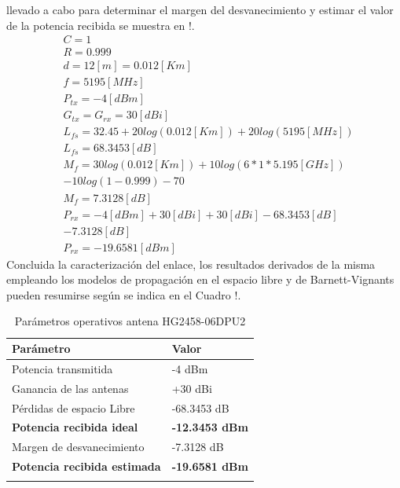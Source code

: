 \documentclass[conference]{IEEEtran}
\begin{document}
llevado a cabo para determinar el margen del desvanecimiento y estimar el valor de la potencia recibida se muestra en !.
\begin{equation}
    \label{eq:Eq7}
    \begin{aligned}
        &C = 1\\
        &R = 0.999\\
        &d = 12[m] = 0.012[Km]\\
        &f = 5195[MHz]\\
        &P_{tx} = -4[dBm]\\
        &G_{tx} = G_{rx} = 30[dBi]\\
        &L_{fs} = 32.45+20log(0.012[Km])+20log(5195[MHz])\\
        &L_{fs} = 68.3453[dB]\\
        &M_{f} = 30log(0.012[Km]) + 10log(6*1*5.195[GHz])\\
        & - 10log(1-0.999) - 70\\
        &M_{f} = 7.3128[dB]\\
        &P_{rx} = -4[dBm] + 30[dBi] + 30[dBi] - 68.3453[dB]\\
        & - 7.3128[dB]\\
        &P_{rx} = -19.6581[dBm]
    \end{aligned}
\end{equation}
Concluida la caracterización del enlace, los resultados derivados de la misma empleando los modelos de 
propagación en el espacio libre y de Barnett-Vignants pueden resumirse según se indica en el Cuadro !.
\begin{table}[!hbt]
    \begin{center}
        \begin{tabular}{ l  l }
            \hline
            \hline
            \textbf{Parámetro} & \textbf{Valor}\\
            \hline
            Potencia transmitida & -4 dBm \\
            Ganancia de las antenas & +30 dBi\\
            Pérdidas de espacio Libre & -68.3453 dB \\
            \textbf{Potencia recibida ideal} & \textbf{-12.3453 dBm} \\
            Margen de desvanecimiento & -7.3128 dB \\
            \textbf{Potencia recibida estimada}  & \textbf{-19.6581 dBm}\\
            \hline
            \hline\\
        \end{tabular}
    \caption[]{Parámetros operativos antena HG2458-06DPU2}
    \label{Cuadro:3}
    \end{center}
\end{table}
\end{document}
